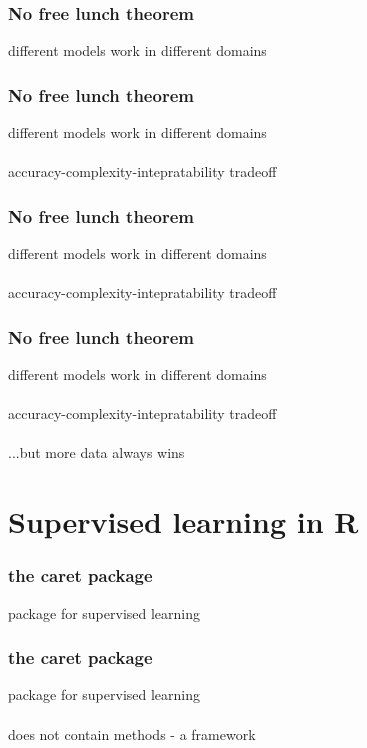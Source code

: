 \documentclass{beamer}
\begin{document}
\begin{frame}
	\frametitle{No free lunch theorem}
	\begin{center}
		different models work in different domains
	\end{center}
\end{frame}

\begin{frame}
	\frametitle{No free lunch theorem}
	\begin{center}
		different models work in different domains\\~\\
		accuracy-complexity-intepratability tradeoff
	\end{center}
\end{frame}

\begin{frame}
	\frametitle{No free lunch theorem}
	\begin{center}
		different models work in different domains\\~\\
		accuracy-complexity-intepratability tradeoff
	\end{center}
\end{frame}

\begin{frame}
	\frametitle{No free lunch theorem}
	\begin{center}
		different models work in different domains\\~\\
		accuracy-complexity-intepratability tradeoff\\~\\
		...but more data always wins
	\end{center}
\end{frame}

\section{Supervised learning in R}

\begin{frame}
	\frametitle{the caret package}
	\begin{center}
		package for supervised learning
	\end{center}
\end{frame}

\begin{frame}
	\frametitle{the caret package}
	\begin{center}
		package for supervised learning\\~\\
		does not contain methods - a framework
	\end{center}
\end{frame}
\end{document}
